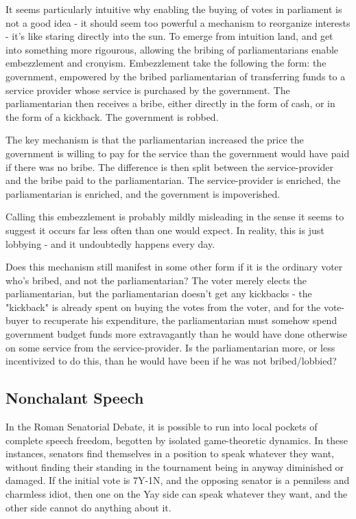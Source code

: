 It seems particularly intuitive why enabling the buying of votes in parliament is not a good idea - it should seem too powerful a mechanism to reorganize interests - it's like staring directly into the sun. To emerge from intuition land, and get into something more rigourous, allowing the bribing of parliamentarians enable embezzlement and cronyism. Embezzlement take the following the form: the government, empowered by the bribed parliamentarian of transferring funds to a service provider whose service is purchased by the government. The parliamentarian then receives a bribe, either directly in the form of cash, or in the form of a kickback. The government is robbed. 

The key mechanism is that the parliamentarian increased the price the government is willing to pay for the service than the government would have paid if there was no bribe. The difference is then split between the service-provider and the bribe paid to the parliamentarian. The service-provider is enriched, the parliamentarian is enriched, and the government is impoverished. 

Calling this embezzlement is probably mildly misleading in the sense it seems to suggest it occurs far less often than one would expect. In reality, this is just lobbying - and it undoubtedly happens every day.


Does this mechanism still manifest in some other form if it is the ordinary voter who's bribed, and not the parliamentarian? The voter merely elects the parliamentarian, but the parliamentarian doesn't get any kickbacks - the "kickback" is already spent on buying the votes from the voter, and for the vote-buyer to recuperate his expenditure, the parliamentarian must somehow spend government budget funds more extravagantly than he would have done otherwise on some service from the service-provider. Is the parliamentarian more, or less incentivized to do this, than he would have been if he was not bribed/lobbied? 




\subsection{Nonchalant Speech}

In the Roman Senatorial Debate, it is possible to run into local pockets of complete speech freedom, begotten by isolated game-theoretic dynamics. In these instances, senators find themselves in a position to speak whatever they want, without finding their standing in the tournament being in anyway diminished or damaged. If the initial vote is 7Y-1N, and the opposing senator is a penniless and charmless idiot, then one on the Yay side can speak whatever they want, and the other side cannot do anything about it.

